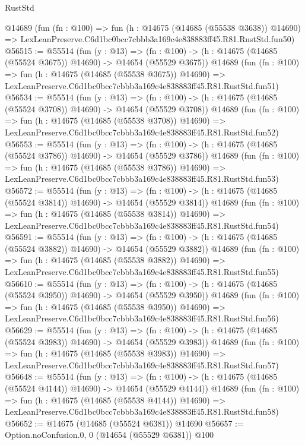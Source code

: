 \begin{lexlean}{RustStd}
\begin{coremodule}
    @14689
    (fun (fn : @100) =>
    fun (h : @14675 (@14685 (@55538 @3638)) @14690) =>
    LexLeanPreserve.C6d1bc0bcc7cbbb3a169c4e838883ff45.R81.RustStd.fun50)
@56515 := @55514
    (fun (y : @13) =>
    (fn : @100) -> (h : @14675 (@14685 (@55524 @3675)) @14690) -> @14654 (@55529 @3675))
    @14689
    (fun (fn : @100) =>
    fun (h : @14675 (@14685 (@55538 @3675)) @14690) =>
    LexLeanPreserve.C6d1bc0bcc7cbbb3a169c4e838883ff45.R81.RustStd.fun51)
@56534 := @55514
    (fun (y : @13) =>
    (fn : @100) -> (h : @14675 (@14685 (@55524 @3708)) @14690) -> @14654 (@55529 @3708))
    @14689
    (fun (fn : @100) =>
    fun (h : @14675 (@14685 (@55538 @3708)) @14690) =>
    LexLeanPreserve.C6d1bc0bcc7cbbb3a169c4e838883ff45.R81.RustStd.fun52)
@56553 := @55514
    (fun (y : @13) =>
    (fn : @100) -> (h : @14675 (@14685 (@55524 @3786)) @14690) -> @14654 (@55529 @3786))
    @14689
    (fun (fn : @100) =>
    fun (h : @14675 (@14685 (@55538 @3786)) @14690) =>
    LexLeanPreserve.C6d1bc0bcc7cbbb3a169c4e838883ff45.R81.RustStd.fun53)
@56572 := @55514
    (fun (y : @13) =>
    (fn : @100) -> (h : @14675 (@14685 (@55524 @3814)) @14690) -> @14654 (@55529 @3814))
    @14689
    (fun (fn : @100) =>
    fun (h : @14675 (@14685 (@55538 @3814)) @14690) =>
    LexLeanPreserve.C6d1bc0bcc7cbbb3a169c4e838883ff45.R81.RustStd.fun54)
@56591 := @55514
    (fun (y : @13) =>
    (fn : @100) -> (h : @14675 (@14685 (@55524 @3882)) @14690) -> @14654 (@55529 @3882))
    @14689
    (fun (fn : @100) =>
    fun (h : @14675 (@14685 (@55538 @3882)) @14690) =>
    LexLeanPreserve.C6d1bc0bcc7cbbb3a169c4e838883ff45.R81.RustStd.fun55)
@56610 := @55514
    (fun (y : @13) =>
    (fn : @100) -> (h : @14675 (@14685 (@55524 @3950)) @14690) -> @14654 (@55529 @3950))
    @14689
    (fun (fn : @100) =>
    fun (h : @14675 (@14685 (@55538 @3950)) @14690) =>
    LexLeanPreserve.C6d1bc0bcc7cbbb3a169c4e838883ff45.R81.RustStd.fun56)
@56629 := @55514
    (fun (y : @13) =>
    (fn : @100) -> (h : @14675 (@14685 (@55524 @3983)) @14690) -> @14654 (@55529 @3983))
    @14689
    (fun (fn : @100) =>
    fun (h : @14675 (@14685 (@55538 @3983)) @14690) =>
    LexLeanPreserve.C6d1bc0bcc7cbbb3a169c4e838883ff45.R81.RustStd.fun57)
@56648 := @55514
    (fun (y : @13) =>
    (fn : @100) -> (h : @14675 (@14685 (@55524 @4144)) @14690) -> @14654 (@55529 @4144))
    @14689
    (fun (fn : @100) =>
    fun (h : @14675 (@14685 (@55538 @4144)) @14690) =>
    LexLeanPreserve.C6d1bc0bcc7cbbb3a169c4e838883ff45.R81.RustStd.fun58)
@56652 := @14675 (@14685 (@55524 @6381)) @14690
@56657 := Option.noConfusion.{0, 0} (@14654 (@55529 @6381)) @100

\end{coremodule}
\end{lexlean}
